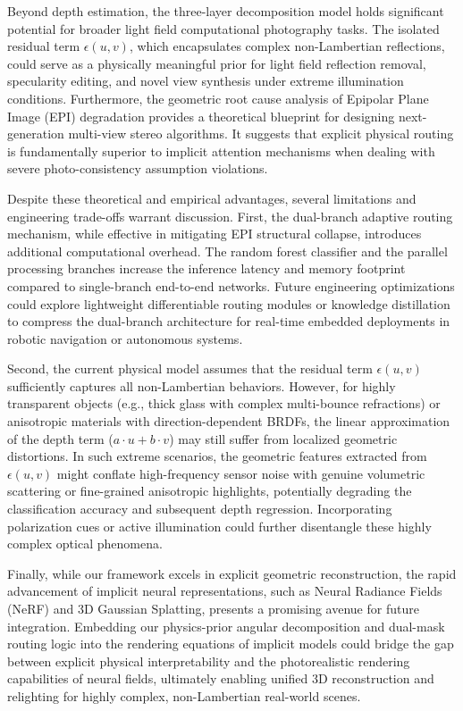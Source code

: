 \documentclass[lettersize,journal]{IEEEtran}
\begin{document}
Beyond depth estimation, the three-layer decomposition model holds significant potential for broader light field computational photography tasks. The isolated residual term $\epsilon(u,v)$, which encapsulates complex non-Lambertian reflections, could serve as a physically meaningful prior for light field reflection removal, specularity editing, and novel view synthesis under extreme illumination conditions. Furthermore, the geometric root cause analysis of Epipolar Plane Image (EPI) degradation provides a theoretical blueprint for designing next-generation multi-view stereo algorithms. It suggests that explicit physical routing is fundamentally superior to implicit attention mechanisms when dealing with severe photo-consistency assumption violations.

Despite these theoretical and empirical advantages, several limitations and engineering trade-offs warrant discussion. First, the dual-branch adaptive routing mechanism, while effective in mitigating EPI structural collapse, introduces additional computational overhead. The random forest classifier and the parallel processing branches increase the inference latency and memory footprint compared to single-branch end-to-end networks. Future engineering optimizations could explore lightweight differentiable routing modules or knowledge distillation to compress the dual-branch architecture for real-time embedded deployments in robotic navigation or autonomous systems. 

Second, the current physical model assumes that the residual term $\epsilon(u,v)$ sufficiently captures all non-Lambertian behaviors. However, for highly transparent objects (e.g., thick glass with complex multi-bounce refractions) or anisotropic materials with direction-dependent BRDFs, the linear approximation of the depth term ($a\cdot u + b\cdot v$) may still suffer from localized geometric distortions. In such extreme scenarios, the geometric features extracted from $\epsilon(u,v)$ might conflate high-frequency sensor noise with genuine volumetric scattering or fine-grained anisotropic highlights, potentially degrading the classification accuracy and subsequent depth regression. Incorporating polarization cues or active illumination could further disentangle these highly complex optical phenomena.

Finally, while our framework excels in explicit geometric reconstruction, the rapid advancement of implicit neural representations, such as Neural Radiance Fields (NeRF) and 3D Gaussian Splatting, presents a promising avenue for future integration. Embedding our physics-prior angular decomposition and dual-mask routing logic into the rendering equations of implicit models could bridge the gap between explicit physical interpretability and the photorealistic rendering capabilities of neural fields, ultimately enabling unified 3D reconstruction and relighting for highly complex, non-Lambertian real-world scenes.
\end{document}
